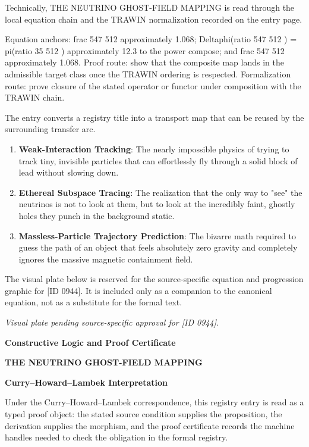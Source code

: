 Technically, THE NEUTRINO GHOST-FIELD MAPPING is read through the local equation chain and the TRAWIN normalization recorded on the entry page.

Equation anchors: frac 547 512 approximately 1.068; Deltaphi(ratio 547 512 ) = pi(ratio 35 512 ) approximately 12.3 to the power compose; and frac 547 512 approximately 1.068. Proof route: show that the composite map lands in the admissible target class once the TRAWIN ordering is respected. Formalization route: prove closure of the stated operator or functor under composition with the TRAWIN chain.

The entry converts a registry title into a transport map that can be reused by the surrounding transfer arc.
\endgroup

\begin{enumerate}[leftmargin=1.6em,itemsep=6pt,topsep=4pt]
\item \textbf{Weak-Interaction Tracking}: The nearly impossible physics of trying to track tiny, invisible particles that can effortlessly fly through a solid block of lead without slowing down.
\item \textbf{Ethereal Subspace Tracing}: The realization that the only way to "see" the neutrinos is not to look at them, but to look at the incredibly faint, ghostly holes they punch in the background static.
\item \textbf{Massless-Particle Trajectory Prediction}: The bizarre math required to guess the path of an object that feels absolutely zero gravity and completely ignores the massive magnetic containment field.
\end{enumerate}

\begingroup\footnotesize\sloppy
The visual plate below is reserved for the source-specific equation and progression graphic for [ID 0944]. It is included only as a companion to the canonical equation, not as a substitute for the formal text.
\par\endgroup
\begingroup\footnotesize\itshape
Visual plate pending source-specific approval for [ID 0944].
\par\endgroup

\clearpage
\begingroup\tzpsupportsetup
\noindent\textbf{\fontsize{10.8pt}{12.8pt}\selectfont [ID 0944] Constructive Logic and Proof Certificate}\par
\noindent\textbf{\fontsize{10pt}{12pt}\selectfont THE NEUTRINO GHOST-FIELD MAPPING}\par
\vspace{0.45em}
\begingroup
\footnotesize
\setlength{\parskip}{0.22em}
\setlength{\parindent}{0pt}
\noindent\textbf{Curry--Howard--Lambek Interpretation}\par
Under the Curry--Howard--Lambek correspondence, this registry entry is read as a typed proof
object: the stated source condition supplies the proposition, the derivation supplies the
morphism, and the proof certificate records the machine handles needed to check the obligation
in the formal registry.

